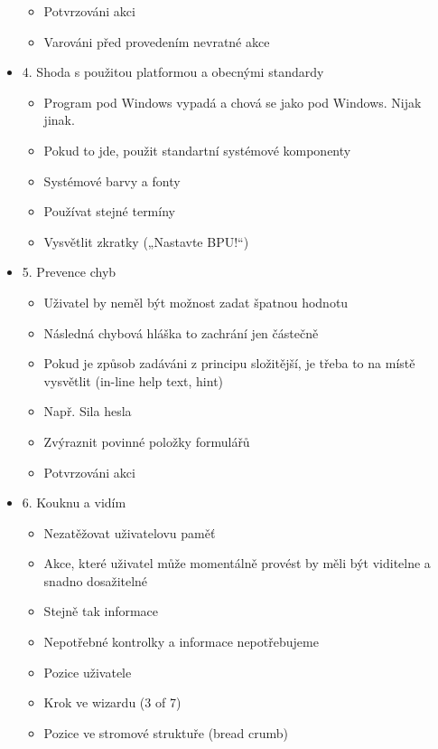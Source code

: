 \begin{itemize}
\begin{itemize}
            \item Potvrzováni akci
            \item Varováni před provedením nevratné akce
        \end{itemize}
    \item 4. Shoda s použitou platformou a obecnými standardy
        \begin{itemize}
            \item Program pod Windows vypadá a chová se jako pod Windows. Nijak jinak.
            \item Pokud to jde, použit standartní systémové komponenty
            \item Systémové barvy a fonty
            \item Používat stejné termíny
            \item Vysvětlit zkratky („Nastavte BPU!“)
        \end{itemize}
    \item 5. Prevence chyb
        \begin{itemize}
            \item Uživatel by neměl být možnost zadat špatnou hodnotu
            \item Následná chybová hláška to zachrání jen částečně
            \item Pokud je způsob zadáváni z principu složitější, je třeba to na místě vysvětlit (in-line help text, hint)
            \item Např. Sila hesla
            \item Zvýraznit povinné položky formulářů
            \item Potvrzováni akci
        \end{itemize}
    \item 6. Kouknu a vidím
        \begin{itemize}
            \item Nezatěžovat uživatelovu paměť
            \item Akce, které uživatel může momentálně provést by měli být viditelne a snadno dosažitelné
            \item Stejně tak informace
            \item Nepotřebné kontrolky a informace nepotřebujeme
            \item Pozice uživatele
            \item Krok ve wizardu (3 of 7)
            \item Pozice ve stromové struktuře (bread crumb)
        \end{itemize}

\end{itemize}
